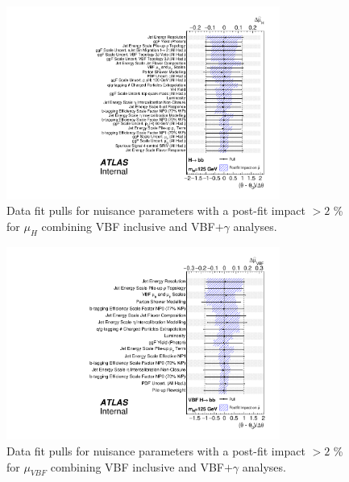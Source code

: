 \begin{figure}[htbp]
  \centering
 \includegraphics[width=0.8\textwidth]{figures/VBF/VBFHbb_Combined_pulls_125.pdf}
\caption{Data fit pulls for nuisance parameters with a post-fit impact $> 2$ \% for $\mu_H$ combining VBF inclusive and VBF$+\gamma$ analyses.}
  \label{fig:vbf-higgsfitpull_combination}
\end{figure}

\begin{figure}[htbp]
  \centering
 \includegraphics[width=0.8\textwidth]{figures/VBF/VBFHbb_Combined_vbfonly_pulls_125.pdf}
\caption{Data fit pulls for nuisance parameters with a post-fit impact $> 2$ \% for $\mu_{VBF}$ combining VBF inclusive and VBF$+\gamma$ analyses.}
  \label{fig:vbf-vbffitpull_combination}
\end{figure}
